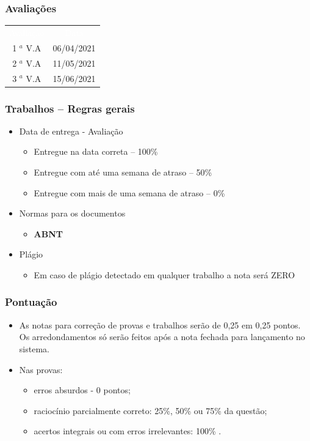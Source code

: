 \documentclass[aspectratio=169,
				xcolor=table]{beamer}
\begin{document}
	\begin{frame}
		\frametitle{Avaliações}
		\begin{eftable}
			\begin{tabular}{c | c}
				\textcolor{white}{Avaliação} & 
				\textcolor{white}{Data} \\
				1 ${}^a$ V.A & 06/04/2021 \\
				2 ${}^a$ V.A & 11/05/2021 \\
				3 ${}^a$ V.A & 15/06/2021 \\			
			\end{tabular}
		\end{eftable}
	\end{frame}	
	
	\begin{frame}
		\frametitle{Trabalhos – Regras gerais}
		\begin{itemize}
			\item Data de entrega - Avaliação
			\begin{itemize}
				\item Entregue na data correta – 100\%
				\item Entregue com até uma semana de atraso – 50\%
				\item Entregue com mais de uma semana de atraso – 0\%
			\end{itemize}
			\item Normas para os documentos
			\begin{itemize}
				\item \textbf{ABNT}
			\end{itemize}
			\item Plágio
			\begin{itemize}
				\item Em caso de plágio detectado em qualquer trabalho a nota será ZERO
			\end{itemize}
		\end{itemize}
	\end{frame}
	
	\begin{frame}
		\frametitle{Pontuação}
		\begin{itemize}
			\item As notas para correção de provas e trabalhos serão de 0,25 em 0,25 pontos. Os arredondamentos só serão feitos após a nota fechada para lançamento no sistema. 

			\item Nas provas: 
			\begin{itemize}
				\item erros absurdos - 0 pontos; 
				\item raciocínio parcialmente correto: 25\%, 50\% ou 75\% da questão; 
				\item acertos integrais ou com erros irrelevantes: 100\% .

			\end{itemize}

		\end{itemize}
	\end{frame}
	
\end{document}
